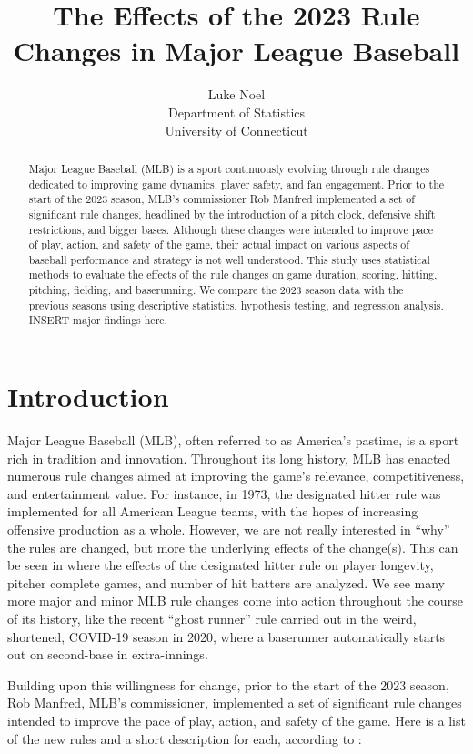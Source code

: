 \documentclass[12pt]{article}
\title{The Effects of the 2023 Rule Changes in Major League Baseball}
\author{Luke Noel\\
  Department of Statistics\\
  University of Connecticut
}
\begin{document}
\maketitle

\begin{abstract}
Major League Baseball (MLB) is a sport continuously evolving through rule
changes dedicated to improving game dynamics, player safety, and fan engagement.
Prior to the start of the 2023 season, MLB's commissioner Rob Manfred
implemented a set of significant rule changes, headlined by the introduction of 
a pitch clock, defensive shift restrictions, and bigger bases. Although these
changes were intended to improve pace of play, action, and safety of the game,
their actual impact on various aspects of baseball performance and strategy is 
not well understood. This study uses statistical methods to evaluate the effects
of the rule changes on game duration, scoring, hitting, pitching, fielding, and
baserunning. We compare the 2023 season data with the previous seasons using
descriptive statistics, hypothesis testing, and regression analysis. INSERT
major findings here.
\end{abstract}


\section{Introduction}
\label{sec:intro}

Major League Baseball (MLB), often referred to as America's pastime, is a sport
rich in tradition and innovation. Throughout its long history, MLB has enacted
numerous rule changes aimed at improving the game's relevance, competitiveness,
and entertainment value. For instance, in 1973, the designated hitter rule was
implemented for all American League teams, with the hopes of increasing
offensive production as a whole. However, we are not really interested in ``why''
the rules are changed, but more the underlying effects of the change(s). This
can be seen in \citet{Cooley} where the effects of the designated hitter rule
on player longevity, pitcher complete games, and number of hit batters are
analyzed. We see many more major and minor MLB rule changes come into action
throughout the course of its history, like the recent ``ghost runner'' rule
carried out in the weird, shortened, COVID-19 season in 2020, where a baserunner 
automatically starts out on second-base in extra-innings.

Building upon this willingness for change, prior to the start of the 2023 season,
Rob Manfred, MLB's commissioner, implemented a set of significant rule changes
intended to improve the pace of play, action, and safety of the game. Here is
a list of the new rules and a short description for each, according to \citet{Castrovince}:
\end{document}
